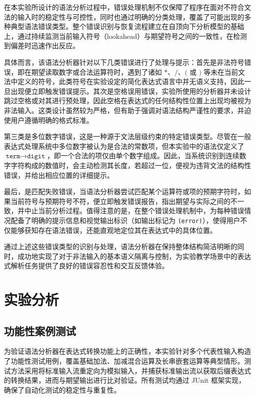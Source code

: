 \documentclass[a4paper, twoside, utf8]{ctexart}
\begin{document}
    在本实验所设计的语法分析过程中，错误处理机制不仅保障了程序在面对不符合文法的输入时的稳定性与可控性，同时也通过明确的分类处理，覆盖了可能出现的多种典型语法错误类型。整个错误识别与恢复流程建立在自顶向下分析模型的基础上，通过持续监测当前输入符号（lookahead）与期望符号之间的一致性，在检测到偏差时迅速作出反应。

    具体而言，该语法分析器针对以下几类错误进行了处理与提示：首先是非法符号错误，即在期望读取数字或合法运算符时，遇到了诸如 $*$、$/$、$($ 或 $)$ 等未在当前文法中定义的符号，此类符号在实验设定的简化表达式语言中并无语义支持，因此一旦出现便立即触发错误提示。其次是空格误用错误，实验所使用的分析器并未设计跳过空格或对其进行预处理，因此空格在表达式的任何结构性位置上出现均被视为非法输入。这类设计虽然较为严格，但有助于强调对语法结构严谨性的要求，并迫使用户遵循明确的格式标准。

    第三类是多位数字错误，这是一种源于文法层级约束的特定错误类型。尽管在一般表达式处理系统中多位数字被认为是合法的常数项，但本实验中的语法仅定义了 $\texttt{term} \rightarrow \texttt{digit}$，即一个合法的项仅由单个数字组成。因此，当系统识别到连续数字字符构成的数值时，会主动检测其长度，若超过一位，便视为违背文法的结构性错误，并给出相应位置的详细提示。

    最后，是匹配失败错误，当语法分析器尝试匹配某个运算符或项的预期字符时，如果当前符号与预期符号不符，便立即触发错误报告，指出期望与实际之间的不一致，并中止当前分析过程。值得注意的是，在整个错误处理机制中，为每种错误情况配备了明确的提示信息和视觉输出标识（如输出标记为 \verb|(error)|），使得用户不仅能够获知存在语法错误，还能直观地定位其在表达式中的具体位置。

    通过上述这些错误类型的识别与处理，语法分析器在保持整体结构简洁明晰的同时，成功地实现了对于非法输入的基本语义隔离与控制，为实验教学场景中的表达式解析任务提供了良好的错误容忍性和交互反馈体验。

    \section{实验分析}

    \subsection{功能性案例测试}

    为验证语法分析器在表达式转换功能上的正确性，本实验针对多个代表性输入构造了功能性测试用例，覆盖基础加法、加减混合运算及长串嵌套运算等典型情形。测试方法采用将标准输入流重定向为模拟输入，并捕获标准输出流以获取后缀表达式的转换结果，进而与期望输出进行比对验证。所有测试均通过 JUnit 框架实现，确保了自动化测试的稳定性与重复性。
\end{document}
